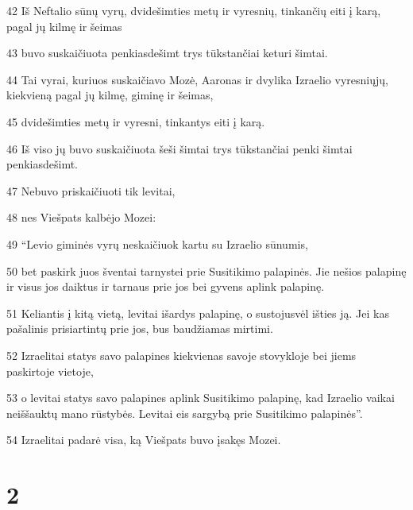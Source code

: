 \par 42 Iš Neftalio sūnų vyrų, dvidešimties metų ir vyresnių, tinkančių eiti į karą, pagal jų kilmę ir šeimas 
\par 43 buvo suskaičiuota penkiasdešimt trys tūkstančiai keturi šimtai. 
\par 44 Tai vyrai, kuriuos suskaičiavo Mozė, Aaronas ir dvylika Izraelio vyresniųjų, kiekvieną pagal jų kilmę, giminę ir šeimas, 
\par 45 dvidešimties metų ir vyresni, tinkantys eiti į karą. 
\par 46 Iš viso jų buvo suskaičiuota šeši šimtai trys tūkstančiai penki šimtai penkiasdešimt. 
\par 47 Nebuvo priskaičiuoti tik levitai, 
\par 48 nes Viešpats kalbėjo Mozei: 
\par 49 “Levio giminės vyrų neskaičiuok kartu su Izraelio sūnumis, 
\par 50 bet paskirk juos šventai tarnystei prie Susitikimo palapinės. Jie nešios palapinę ir visus jos daiktus ir tarnaus prie jos bei gyvens aplink palapinę. 
\par 51 Keliantis į kitą vietą, levitai išardys palapinę, o sustojus­vėl išties ją. Jei kas pašalinis prisiartintų prie jos, bus baudžiamas mirtimi. 
\par 52 Izraelitai statys savo palapines kiekvienas savoje stovykloje bei jiems paskirtoje vietoje, 
\par 53 o levitai statys savo palapines aplink Susitikimo palapinę, kad Izraelio vaikai neiššauktų mano rūstybės. Levitai eis sargybą prie Susitikimo palapinės”. 
\par 54 Izraelitai padarė visa, ką Viešpats buvo įsakęs Mozei.


\chapter{2}


